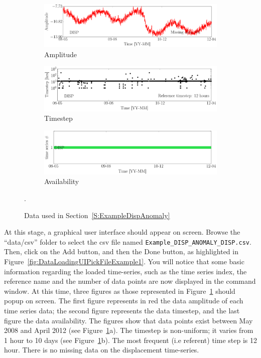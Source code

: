 \begin{figure}[h!]
\centering
\begin{subfigure}{\linewidth}
\includegraphics[width=0.9\linewidth]{./docfigs/Example_DISPSIM_ANOMALY/raw/ALL_AMPLITUDES.pdf} 
\caption{Amplitude}
\end{subfigure}
\begin{subfigure}{\linewidth}
\includegraphics[width=0.9\linewidth]{./docfigs/Example_DISPSIM_ANOMALY/raw/ALL_TIMESTEPS.pdf}
\caption{Timestep}
\end{subfigure}
\begin{subfigure}{\linewidth}
\includegraphics[width=0.9\linewidth]{./docfigs/Example_DISPSIM_ANOMALY/raw/AVAILABILITY.pdf}
\caption{Availability}
\end{subfigure}
\caption{Data used in Section~\ref{S:ExampleDispAnomaly}}.
\label{fig:DataSummaryRaw3}
\end{figure}


At this stage, a graphical user interface should appear on screen. 
Browse the ``data/csv'' folder to select the csv file named \lstinline[basicstyle = \mlttfamily \small, backgroundcolor = \color{light-gray}]!Example_DISP_ANOMALY_DISP.csv!.
Then, click on the Add button, and then the Done button, as highlighted in Figure~\ref{fig:DataLoadingUIPickFileExample1}.
You will notice that some basic information regarding the loaded time-series, such as the time series index, the reference name and the number of data points are now displayed in the \MATLAB{} command window.
At this time, three \MATLAB{} figures as those represented in Figure~\ref{fig:DataSummaryRaw3} should popup on screen.
The first figure represents in red the data amplitude of each time series data; the second figure represents the data timestep, and the last figure the data availability.
The figures show that data points exist between May 2008 and April 2012 (see Figure~\ref{fig:DataSummaryRaw3}a).
The timestep is non-uniform; it varies from 1 hour to 10 days (see Figure~\ref{fig:DataSummaryRaw3}b). 
The most frequent (i.e referent) time step is 12 hour.
There is no missing data on the displacement time-series.

